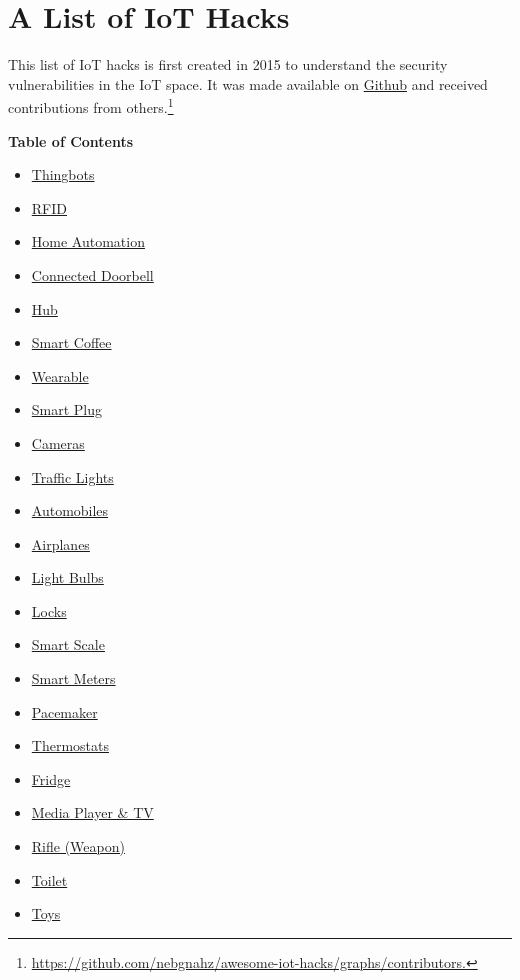 \chapter{A List of IoT Hacks}
\label{chap:iot-hacks}

This list of IoT hacks is first created in 2015 to understand the security
vulnerabilities in the IoT space. It was made available on
\href{https://github.com/nebgnahz/awesome-iot-hacks}{Github} and received
contributions from
others.\footnote{\url{https://github.com/nebgnahz/awesome-iot-hacks/graphs/contributors.}}

\vspace{1em}
\noindent \textbf{Table of Contents}
\begin{itemize}[topsep=0pt]
  \tightlist
\item
  \protect\hyperlink{thingbots}{Thingbots}
\item
  \protect\hyperlink{rfid}{RFID}
\item
  \protect\hyperlink{home-automation}{Home Automation}
\item
  \protect\hyperlink{connected-doorbell}{Connected Doorbell}
\item
  \protect\hyperlink{hub}{Hub}
\item
  \protect\hyperlink{smart-coffee}{Smart Coffee}
\item
  \protect\hyperlink{wearable}{Wearable}
\item
  \protect\hyperlink{smart-plug}{Smart Plug}
\item
  \protect\hyperlink{cameras}{Cameras}
\item
  \protect\hyperlink{traffic-lights}{Traffic Lights}
\item
  \protect\hyperlink{automobiles}{Automobiles}
\item
  \protect\hyperlink{airplanes}{Airplanes}
\item
  \protect\hyperlink{light-bulbs}{Light Bulbs}
\item
  \protect\hyperlink{locks}{Locks}
\item
  \protect\hyperlink{smart-scale}{Smart Scale}
\item
  \protect\hyperlink{smart-meters}{Smart Meters}
\item
  \protect\hyperlink{pacemaker}{Pacemaker}
\item
  \protect\hyperlink{thermostats}{Thermostats}
\item
  \protect\hyperlink{fridge}{Fridge}
\item
  \protect\hyperlink{media-player--tv}{Media Player \& TV}
\item
  \protect\hyperlink{rifle-weapon}{Rifle (Weapon)}
\item
  \protect\hyperlink{toilet}{Toilet}
\item
  \protect\hyperlink{toys}{Toys}
\end{itemize}

